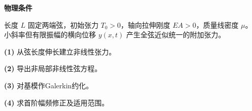 \textbf{物理条件}\par 长度 \(L\) 固定两端弦，初始张力 \(T_0>0\)，轴向拉伸刚度 \(EA>0\)，质量线密度 \(\mu\)。小斜率但有限振幅的横向位移 \(y(x,t)\) 产生全弦近似统一的附加张力。
\par\noindent\textbf{(1)} 从弦长度伸长建立非线性张力。
\par\noindent\textbf{(2)} 导出非局部非线性弦方程。
\par\noindent\textbf{(3)} 对基模作Galerkin约化。
\par\noindent\textbf{(4)} 求首阶幅频修正及适用范围。

